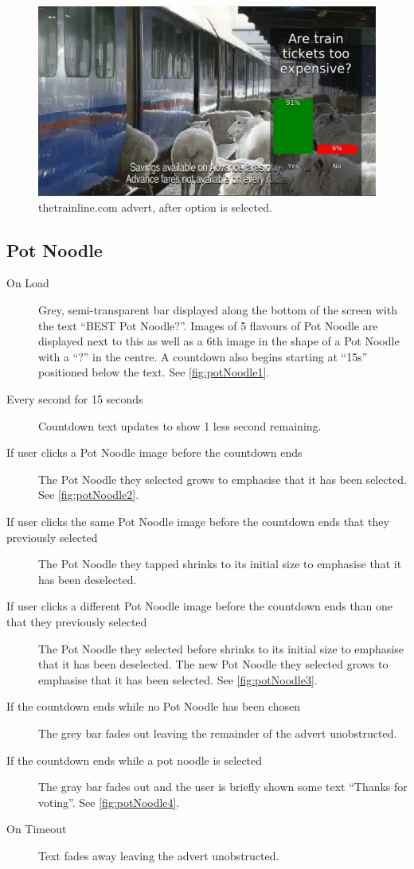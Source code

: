	\begin{figure}[th]
		\centering
		\includegraphics[width=\textwidth,height=0.5\textheight,keepaspectratio]{images/adverts/trainline-2.png}
		\caption{thetrainline.com advert, after option is selected.}
		\label{fig:trainline2}
	\end{figure}
	
\subsection{Pot Noodle}
	\begin{description}
		\item[On Load]{Grey, semi-transparent bar displayed along the bottom of the screen with the text ``BEST Pot Noodle?''. Images of 5 flavours of Pot Noodle are displayed next to this as well as a 6th image in the shape of a Pot Noodle with a ``?'' in the centre. A countdown also begins starting at ``15s'' positioned below the text. See \ref{fig:potNoodle1}.}
		\item[Every second for 15 seconds]{Countdown text updates to show 1 less second remaining.}
		\item[If user clicks a Pot Noodle image before the countdown ends]{The Pot Noodle they selected grows to emphasise that it has been selected. See \ref{fig:potNoodle2}.}		
		\item[If user clicks the same Pot Noodle image before the countdown ends that they previously selected]{The Pot Noodle they tapped shrinks to its initial size to emphasise that it has been deselected.}
		\item[If user clicks a different Pot Noodle image before the countdown ends than one that they previously selected]{The Pot Noodle they selected before shrinks to its initial size to emphasise that it has been deselected. The new Pot Noodle they selected grows to emphasise that it has been selected. See \ref{fig:potNoodle3}.}
		\item[If the countdown ends while no Pot Noodle has been chosen]{The grey bar fades out leaving the remainder of the advert unobstructed.}
		\item[If the countdown ends while a pot noodle is selected]{The gray bar fades out and the user is briefly shown some text ``Thanks for voting''. See \ref{fig:potNoodle4}.}
		\item[On Timeout]{Text fades away leaving the advert unobstructed.}
	\end{description}
	
